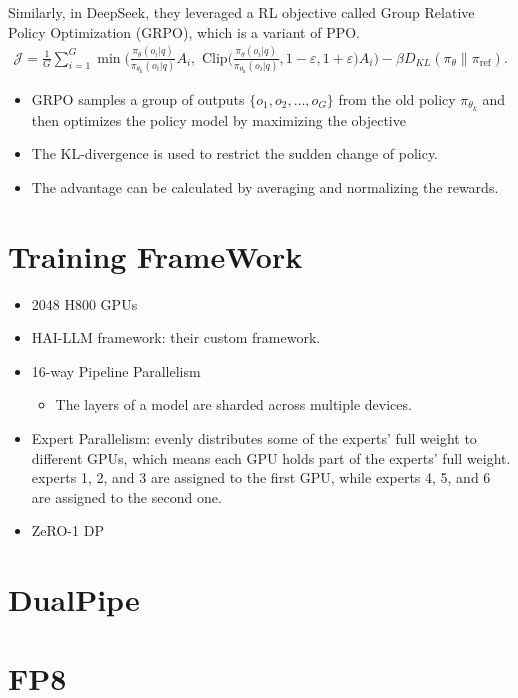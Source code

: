 Similarly, in DeepSeek, they leveraged a RL objective called Group Relative Policy Optimization (GRPO), which is a variant of PPO. 
\begin{align*}
	\mathcal{J} = \frac{1}{G}\sum_{i=1}^{G} \min \Bigg(\frac{\pi_{\theta}\left(o_i | q\right)}{\pi_{\theta_{\text {k}}}\left(o_i | q\right)} A_i, \textrm{ Clip}\Bigg(\frac{\pi_{\theta}\left(o_i | q\right)}{\pi_{\theta_{\text {k}}}\left(o_i | q\right)}, 1-\varepsilon, 1+\varepsilon\Bigg) A_{i}\Bigg) -\beta D_{KL}(\pi_{\theta}\| \pi_{\text{ref}}).
\end{align*}
\begin{itemize}
	\item GRPO samples a group of outputs $\{o_1, o_2,\dots, o_G \}$ from the old policy $\pi_{\theta_k}$ and then optimizes the policy model by maximizing the objective 
	\item The KL-divergence is used to restrict the sudden change of policy.
	\item The advantage can be calculated by averaging and normalizing the rewards.
\end{itemize}








\section{Training FrameWork}
\begin{itemize}
	\item 2048 H800 GPUs
	\item HAI-LLM framework: their custom framework. 
	\item 16-way Pipeline Parallelism
		\begin{itemize}
			\item The layers of a model are sharded across multiple devices. 
		\end{itemize}
	\item Expert Parallelism: evenly distributes some of the experts' full weight to different GPUs, which means each GPU holds part of the experts' full weight. \eg experts 1, 2, and 3 are assigned to the first GPU, while experts 4, 5, and 6 are assigned to the second one.
	\item ZeRO-1 DP
\end{itemize}
\section{DualPipe}
\section{FP8}


